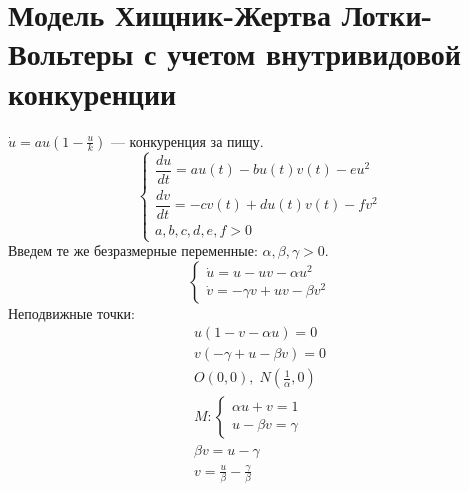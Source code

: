         \section{Модель Хищник-Жертва Лотки-Вольтеры с учетом внутривидовой конкуренции}
         $\dot{u} = a u \left(1 - \frac{u}{k}\right)$ --- конкуренция за пищу.
         \begin{equation}
         \begin{cases}
         \dfrac{du}{dt} = au(t) - bu(t)v(t) - eu^2 \\[8pt]
         \dfrac{dv}{dt} = -cv(t) + du(t)v(t) - fv^2\\
         a,b,c,d,e,f > 0
         \end{cases}
\end{equation}
Введем те же безразмерные переменные: $\alpha, \beta, \gamma > 0$.
\begin{equation}
\begin{cases}
\dot{u} = u - uv - \alpha u^2\\
\dot{v} = -\gamma v + uv - \beta v^2
\end{cases}
\end{equation}             
       Неподвижные точки:
       \begin{gather*}
       u(1 - v - \alpha u) = 0\\
       v(-\gamma + u - \beta v) = 0\\
       O(0,0), \; N\left(\frac{1}{\alpha}, 0\right)\\
       M:\begin{cases}
       \alpha u + v = 1\\
       u - \beta v = \gamma
       \end{cases}\\
       \beta v = u - \gamma\\
       v = \frac{u}{\beta} - \frac{\gamma}{\beta}
\end{gather*}       
       
